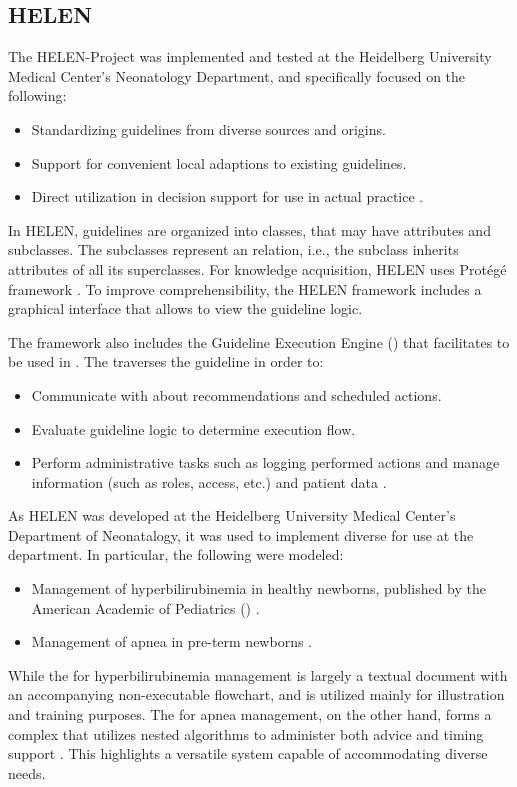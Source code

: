 \subsection{HELEN}\label{sec:helen}

The HELEN-Project was implemented and tested at
the Heidelberg University Medical Center's Neonatology Department,
and specifically focused on the following:
\begin{itemize}
  \item Standardizing guidelines from diverse sources and origins.
  \item Support for convenient local adaptions to existing guidelines.
  \item Direct utilization in decision support for use in actual practice \cite{SkonetzkiMIM04}.
\end{itemize}

In HELEN, guidelines are organized into classes, that may have attributes and
subclasses. The subclasses represent an  relation, i.e., the subclass
inherits attributes of all its superclasses.
For knowledge acquisition, HELEN uses Prot\'eg\'e framework \cite{GennariIJHS03}.
To improve comprehensibility, the HELEN framework includes a graphical interface
that allows \HCPs{} to view the guideline logic.

The framework also includes the Guideline Execution Engine (\GEE{}) that
facilitates \BPGs{} to be used in \CDSSs{}. The \GEE{} traverses the guideline
in order to:
\begin{itemize}
  \item Communicate with \HCPs{} about recommendations and scheduled actions.
  \item Evaluate guideline logic to determine execution flow.
  \item Perform administrative tasks such as logging performed actions and
    manage \HCP{} information (such as roles, access, etc.) and patient data
    \cite{SkonetzkiMIM04}.
\end{itemize}

As HELEN was developed at the Heidelberg University Medical Center's Department
of Neonatalogy, it was used to implement diverse \BPGs{} for use at the
department. In particular, the following \BPGs{} were modeled:
\begin{itemize}
  \item Management of hyperbilirubinemia in healthy newborns, published by the
    American Academic of Pediatrics (\AAP{}) \cite{HyperbilirubinemiaAAP94}.
  \item Management of apnea in pre-term newborns \cite{BhatiaCP00}.
\end{itemize}
While the \BPG{} for hyperbilirubinemia management is largely a textual document
with an accompanying non-executable flowchart, and is utilized mainly for
illustration and training purposes. The \BPG{} for apnea management, on the
other hand, forms a complex \CDSSs{} that utilizes nested algorithms to
administer both advice and timing support \cite{SkonetzkiMIM04}. This highlights
a versatile system capable of  accommodating diverse needs.

